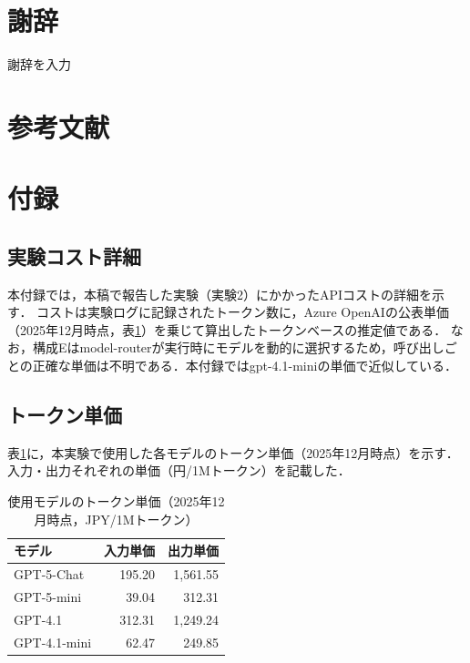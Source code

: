 \documentclass[a4paper,10pt]{jarticle}
\begin{document}

\section*{\small{謝辞}}
\small{
謝辞を入力
}


\typeout{} 
\small{
\section*{\small{参考文献} \vspace{-10mm}}


}


\newpage
\appendix
\section{付録}

\subsection{実験コスト詳細}
\label{subsec:appendix_cost}

本付録では，本稿で報告した実験（実験2）にかかったAPIコストの詳細を示す．
コストは実験ログに記録されたトークン数に，Azure OpenAIの公表単価（2025年12月時点，表\ref{tab:token_prices}）を乗じて算出したトークンベースの推定値である．
なお，構成Eはmodel-routerが実行時にモデルを動的に選択するため，呼び出しごとの正確な単価は不明である．本付録ではgpt-4.1-miniの単価で近似している．

\subsection{トークン単価}

表\ref{tab:token_prices}に，本実験で使用した各モデルのトークン単価（2025年12月時点）を示す．入力・出力それぞれの単価（円/1Mトークン）を記載した．

\begin{table}[htbp]
\centering
\caption{使用モデルのトークン単価（2025年12月時点，JPY/1Mトークン）}
\label{tab:token_prices}
\begin{tabular}{lrr}
\toprule
モデル & 入力単価 & 出力単価 \\
\midrule
GPT-5-Chat & 195.20 & 1,561.55 \\
GPT-5-mini & 39.04 & 312.31 \\
GPT-4.1 & 312.31 & 1,249.24 \\
GPT-4.1-mini & 62.47 & 249.85 \\
\bottomrule
\end{tabular}
\end{table}
\end{document}
